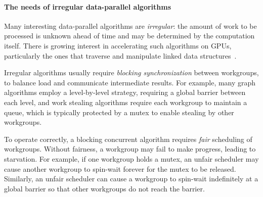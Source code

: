 \documentclass[numbers,nocopyrightspace,10pt]{sigplanconf}
\begin{document}
\paragraph{The needs of irregular data-parallel algorithms}
Many
interesting data-parallel algorithms are \emph{irregular}: the amount
of work to be processed is unknown ahead of time and may be determined
by the computation itself.  There is growing interest in accelerating
such algorithms on GPUs, particularly the ones that
traverse and manipulate linked data structures~\cite{owens-persistent,DBLP:conf/ipps/KaleemVPHP16,DBLP:conf/ipps/DavidsonBGO14,DBLP:conf/hipc/HarishN07,DBLP:journals/topc/MerrillGG15,DBLP:conf/egh/VineetHPN09,DBLP:conf/ppopp/NobariCKB12,DBLP:conf/hpcc/SolomonTT10a,DBLP:conf/popl/PrabhuRMH11,DBLP:conf/ppopp/Mendez-LojoBP12,DBLP:conf/oopsla/PaiP16,DBLP:conf/oopsla/SorensenDBGR16,DBLP:conf/egh/CedermanT08,TPO10,BNP12,Pannotia}.

Irregular algorithms usually require \emph{blocking synchronization}
between workgroups, to balance load and communicate intermediate
results.  For example, many graph algorithms employ a level-by-level strategy, requiring a global barrier between each level, and 
work stealing algorithms require each workgroup
to maintain a queue, which is typically protected by a mutex to enable
stealing by other workgroups.

To operate correctly, a blocking concurrent algorithm requires
\emph{fair} scheduling of workgroups.  Without fairness, a
workgroup may fail to make progress, leading to starvation.  For
example, if one workgroup holds a mutex, an unfair scheduler may cause
another workgroup to spin-wait forever for the mutex to be
released.  Similarly, an unfair scheduler can cause a workgroup to spin-wait
indefinitely at a global barrier so that other workgroups do not reach the barrier.

\vspace{-1mm}
\end{document}
